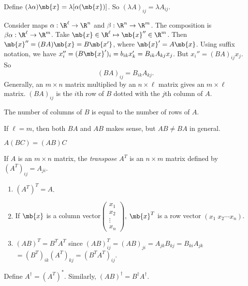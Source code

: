 \documentclass[a4paper]{article}
\begin{document}
\begin{defi}
  Define $(\lambda\alpha)\mb{x} = \lambda[\alpha(\mb{x})]$. So $(\lambda A)_{ij} = \lambda A_{ij}$.
\end{defi}

\begin{defi}
  Consider maps $\alpha: \R^\ell \to \R^n$  and $\beta: \R^n\to \R^m$. The composition is $\beta\alpha:\R^\ell\to\R^m$. Take $\mb{x}\in \R^\ell\mapsto \mb{x}''\in \R^m$. Then $\mb{x}'' = (BA)\mb{x} = B\mb{x'}$, where $\mb{x}' = A\mb{x}$. Using suffix notation, we have $x_i'' = (B\mb{x}')_i = b_{ik}x_k' = B_{ik}A_{kj}x_j$. But $x_i'' = (BA)_{ij}x_j$. So 
  \[
  (BA)_{ij} = B_{ik}A_{kj}.
  \]
  Generally, an $m\times n$ matrix multiplied by an $n\times \ell$ matrix gives an $m\times\ell$ matrix. $(BA)_{ij}$ is the $i$th row of $B$ dotted with the $j$th column of $A$.
\end{defi}
\note The number of columns of $B$ is equal to the number of rows of $A$.

\note If $\ell = m$, then both $BA$ and $AB$ makes sense, but $AB\not= BA$ in general.

\note $A(BC) = (AB)C$

\begin{defi}
  If $A$ is an $m\times n$ matrix, the \emph{transpose} $A^T$ is an $n\times m$ matrix defined by $(A^T)_{ij} = A_{ji}$.
\end{defi}

\begin{prop}\leavevmode
  \begin{enumerate}
  \item $(A^T)^T = A$.
  \item If $\mb{x}$ is a column vector$\begin{pmatrix}x_1\\x_2\\\vdots\\x_n\end{pmatrix}$, $\mb{x}^T$ is a row vector $(x_1\; x_2\cdots x_n)$.
  \item $(AB)^T = B^TA^T$ since $(AB)^T_{ij} = (AB)_{ji} = A_{jk}B_{kj} = B_{ki}A_{jk} $\\$= (B^T)_{ik}(A^T)_{kj} = (B^TA^T)_{ij}$.
  \end{enumerate}
\end{prop}

\begin{defi}
  Define $A^{\dagger} = (A^T)^*$. Similarly, $(AB)^\dagger = B^\dagger A^\dagger$.
\end{defi}
\end{document}
